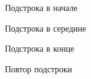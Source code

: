\documentclass[a4paper,12pt]{article}
\begin{document}
\begin{figure}[h!]
	\caption{
		Подстрока в начале}
	\label{fig:t2}
\end{figure}

\pagebreak

\begin{figure}[h!]
	\caption{
		Подстрока в середине}
	\label{fig:t3}
\end{figure}

\begin{figure}[h!]
	\caption{
		Подстрока в конце}
	\label{fig:t4}
\end{figure}

\begin{figure}[h!]
	\caption{
		Повтор подстроки}
	\label{fig:t5}
\end{figure}
\end{document}
